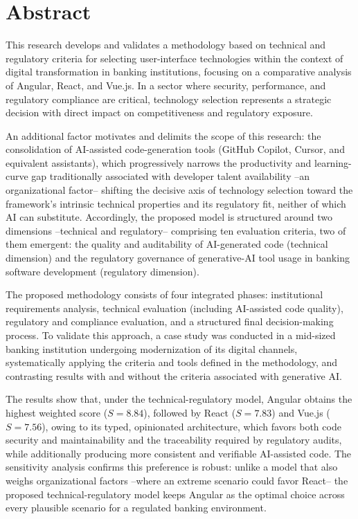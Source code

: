\chapter*{Abstract}

This research develops and validates a methodology based on technical and
regulatory criteria for selecting user-interface technologies within the
context of digital transformation in banking institutions, focusing on a
comparative analysis of Angular, React, and Vue.js. In a sector where
security, performance, and regulatory compliance are critical, technology
selection represents a strategic decision with direct impact on
competitiveness and regulatory exposure.

An additional factor motivates and delimits the scope of this research: the
consolidation of AI-assisted code-generation tools (GitHub Copilot, Cursor,
and equivalent assistants), which progressively narrows the productivity and
learning-curve gap traditionally associated with developer talent
availability --an organizational factor-- shifting the decisive axis of
technology selection toward the framework's intrinsic technical properties
and its regulatory fit, neither of which AI can substitute. Accordingly, the
proposed model is structured around two dimensions --technical and
regulatory-- comprising ten evaluation criteria, two of them emergent: the
quality and auditability of AI-generated code (technical dimension) and the
regulatory governance of generative-AI tool usage in banking software
development (regulatory dimension).

The proposed methodology consists of four integrated phases: institutional
requirements analysis, technical evaluation (including AI-assisted code
quality), regulatory and compliance evaluation, and a structured final
decision-making process. To validate this approach, a case study was
conducted in a mid-sized banking institution undergoing modernization of its
digital channels, systematically applying the criteria and tools defined in
the methodology, and contrasting results with and without the criteria
associated with generative AI.

The results show that, under the technical-regulatory model, Angular obtains
the highest weighted score ($S=8.84$), followed by React ($S=7.83$) and
Vue.js ($S=7.56$), owing to its typed, opinionated architecture, which favors
both code security and maintainability and the traceability required by
regulatory audits, while additionally producing more consistent and
verifiable AI-assisted code. The sensitivity analysis confirms this
preference is robust: unlike a model that also weighs organizational
factors --where an extreme scenario could favor React-- the proposed
technical-regulatory model keeps Angular as the optimal choice across every
plausible scenario for a regulated banking environment.

